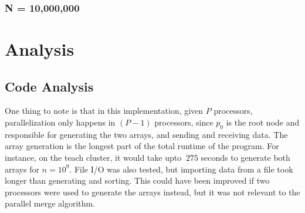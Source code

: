 \documentclass[12pt]{article}
\begin{document}
{\subsubsection{N = 10,000,000}
\mydata
{}
    
    \newpage 
    \section {Analysis}
    \subsection{Code Analysis}
    One thing to note is that in this implementation, given $P$ processors, parallelization only happens in $(P-1)$ processors, since $p_0$ is the root node and responsible for generating the two arrays, and sending and receiving data. The array generation is the longest part of the total runtime of the program. For instance, on the teach cluster, it would take upto $~275$ seconds to generate both arrays for $n = 10^9$. File I/O was also tested, but importing data from a file took longer than generating and sorting. This could have been improved if two processors were used to generate the arrays instead, but it was not relevant to the parallel merge algorithm.

}
\end{document}
